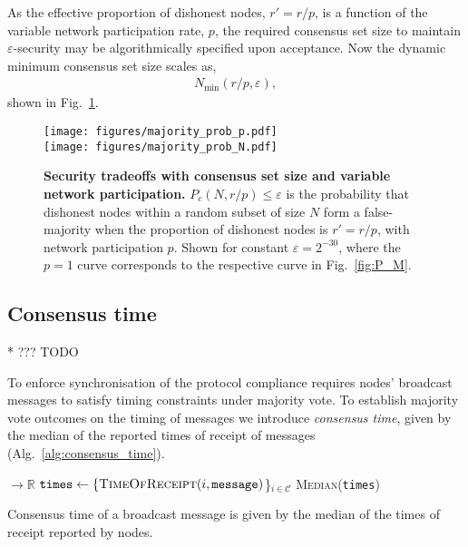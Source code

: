 \documentclass[twocolumn, aps, amsmath, amssymb, nofootinbib, superscriptaddress, longbibliography, floatfix, eqsecnum, rmp]{revtex4-2}
\let\oldalgorithmic\algorithmic
\let\endoldalgorithmic\endalgorithmic
\renewenvironment{algorithmic}
{\begin{adjustwidth}{-1em}{}\oldalgorithmic}
{\endoldalgorithmic\end{adjustwidth}}
\begin{document}
As the effective proportion of dishonest nodes, \mbox{$r'=r/p$}, is a function of the variable network participation rate, $p$, the required consensus set size to maintain $\varepsilon$-security may be algorithmically specified upon acceptance. Now the dynamic minimum consensus set size scales as,
\begin{align}
	N_\mathrm{min}(r/p,\varepsilon),
\end{align}
shown in Fig.~\ref{fig:P_M_p}.

\begin{figure}
	\texttt{[image: figures/majority\_prob\_p.pdf]}\\
	\texttt{[image: figures/majority\_prob\_N.pdf]}
	\caption{\textbf{Security tradeoffs with consensus set size and variable network participation.} \mbox{$P_c(N,r/p)\leq\varepsilon$} is the probability that dishonest nodes within a random subset of size $N$ form a false-majority when the proportion of dishonest nodes is \mbox{$r'=r/p$}, with network participation $p$. Shown for constant \mbox{$\varepsilon=2^{-30}$}, where the \mbox{$p=1$} curve corresponds to the respective curve in Fig.~\ref{fig:P_M}.}\label{fig:P_M_p}
\end{figure}

\subsection{Consensus time}

* ??? TODO

To enforce synchronisation of the protocol compliance requires nodes' broadcast messages to satisfy timing constraints under majority vote. To establish majority vote outcomes on the timing of messages we introduce \emph{consensus time}, given by the median of the reported times of receipt of messages (Alg.~\ref{alg:consensus_time}).

\begin{algorithm}[H]
\begin{algorithmic}
 $\to \mathbb{R}$
	\State $\texttt{times} \gets \{\textsc{TimeOfReceipt}(i,\texttt{message})$\}$_{i\in\mathcal{C}}$
	\State \Return \textsc{Median}(\texttt{times})
\EndFunction
\end{algorithmic}	
\caption{Consensus time of a broadcast message is given by the median of the times of receipt reported by nodes.} \label{alg:consensus_time}
\end{algorithm}
\end{document}
